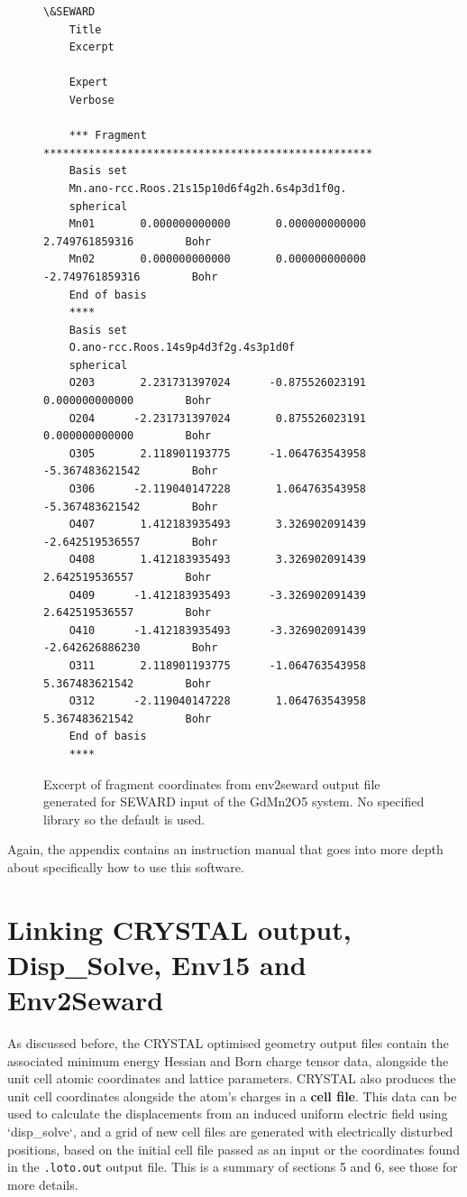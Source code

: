 \documentclass[10pt]{article}
\begin{document}
\begin{figure}[htbp]
	\hspace*{-2.5cm}
	\begin{BVerbatim}[fontsize=\small]
	\&SEWARD
	Title
	Excerpt
	
	Expert
	Verbose
	
	*** Fragment ***************************************************
	Basis set
	Mn.ano-rcc.Roos.21s15p10d6f4g2h.6s4p3d1f0g.
	spherical
	Mn01       0.000000000000       0.000000000000       2.749761859316        Bohr
	Mn02       0.000000000000       0.000000000000      -2.749761859316        Bohr
	End of basis
	****
	Basis set
	O.ano-rcc.Roos.14s9p4d3f2g.4s3p1d0f
	spherical
	O203       2.231731397024      -0.875526023191       0.000000000000        Bohr
	O204      -2.231731397024       0.875526023191       0.000000000000        Bohr
	O305       2.118901193775      -1.064763543958      -5.367483621542        Bohr
	O306      -2.119040147228       1.064763543958      -5.367483621542        Bohr
	O407       1.412183935493       3.326902091439      -2.642519536557        Bohr
	O408       1.412183935493       3.326902091439       2.642519536557        Bohr
	O409      -1.412183935493      -3.326902091439       2.642519536557        Bohr
	O410      -1.412183935493      -3.326902091439      -2.642626886230        Bohr
	O311       2.118901193775      -1.064763543958       5.367483621542        Bohr
	O312      -2.119040147228       1.064763543958       5.367483621542        Bohr
	End of basis
	****
	\end{BVerbatim}
	\caption{Excerpt of fragment coordinates from env2seward output file generated for SEWARD input of the GdMn2O5 system. No specified library so the default is used.}
\end{figure}

Again, the appendix contains an instruction manual that goes into more depth about specifically how to use this software.

\section{Linking CRYSTAL output, Disp\_Solve, Env15 and Env2Seward}

As discussed before, the CRYSTAL optimised geometry output files contain the associated minimum energy Hessian and Born charge tensor data, alongside the unit cell atomic coordinates and lattice parameters. CRYSTAL also produces the unit cell coordinates alongside the atom's charges in a \textbf{cell file}. This data can be used to calculate the displacements from an induced uniform electric field using `disp\_solve`, and a grid of new cell files are generated with electrically disturbed positions, based on the initial cell file passed as an input or the coordinates found in the \texttt{.loto.out} output file. This is a summary of sections 5 and 6, see those for more details.
\end{document}

